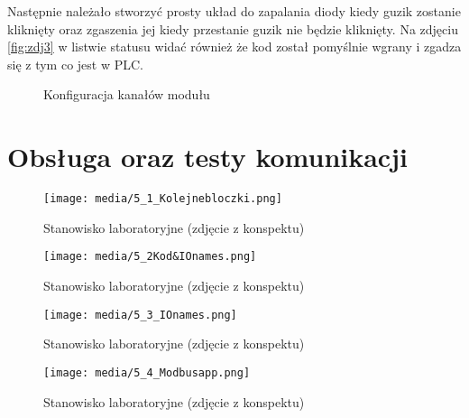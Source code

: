 \documentclass{article}
\begin{document}
\newpage
Następnie należało stworzyć prosty układ do zapalania diody kiedy guzik zostanie kliknięty oraz zgaszenia jej kiedy przestanie guzik nie będzie kliknięty. Na zdjęciu \ref{fig:zdj3} w listwie statusu widać również że kod został pomyślnie wgrany i zgadza się z tym co jest w PLC.

\begin{figure}[!ht]
    \centering
   
        \hfill
    \caption{Konfiguracja kanałów modułu}
    \label{fig:main1}
\end{figure}


\newpage
\section{Obsługa oraz testy komunikacji}

\begin{figure}[H]
    \centering
    \texttt{[image: media/5\_1\_Kolejnebloczki.png]}
    \caption{Stanowisko laboratoryjne (zdjęcie z konspektu)}
    \label{fig:zdj7}
\end{figure}


\begin{figure}[H]
    \centering
    \texttt{[image: media/5\_2Kod\&IOnames.png]}
    \caption{Stanowisko laboratoryjne (zdjęcie z konspektu)}
    \label{fig:zdj8}
\end{figure}


\begin{figure}[H]
    \centering
    \texttt{[image: media/5\_3\_IOnames.png]}
    \caption{Stanowisko laboratoryjne (zdjęcie z konspektu)}
    \label{fig:zdj9}
\end{figure}


\begin{figure}[H]
    \centering
    \texttt{[image: media/5\_4\_Modbusapp.png]}
    \caption{Stanowisko laboratoryjne (zdjęcie z konspektu)}
    \label{fig:zdj10}
\end{figure}
\end{document}
